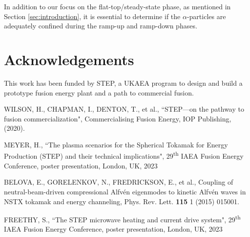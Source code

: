 \documentclass[10pt, a4paper, twoside]{article}
\begin{document}
In addition to our focus on the flat-top/steady-state phase, as mentioned in Section \ref{sec:introduction}, it is essential to determine if the $\alpha$-particles are adequately confined during the ramp-up and ramp-down phases.

\section*{Acknowledgements}

This work has been funded by STEP, a UKAEA program to design and build a prototype fusion energy plant and a path to commercial fusion.

\fontsize{9}{12}\selectfont
\setlength{\parskip}{0pt}
\begin{thebibliography}{9}

    WILSON, H., CHAPMAN, I., DENTON, T., et al., 
    ``STEP---on the pathway to fusion commercialization", 
    Commercialising Fusion Energy, 
    IOP Publishing, 
    (2020).

    MEYER, H.,
    ``The plasma scenarios for the Spherical Tokamak for Energy Production (STEP) and their technical implications",
    29\textsuperscript{th} IAEA Fusion Energy Conference,
    poster presentation, 
    London, UK, 
    2023

    BELOVA, E., GORELENKOV, N., FREDRICKSON, E., et al., 
    Coupling of neutral-beam-driven compressional Alfv\'en eigenmodes to kinetic Alfv\'en waves in NSTX tokamak and energy channeling, 
    Phys. Rev. Lett. 
    \textbf{115} 1 
    (2015) 
    015001.

    FREETHY, S.,
    ``The STEP microwave heating and current drive system",
    29\textsuperscript{th} IAEA Fusion Energy Conference,
    poster presentation, 
    London, UK, 
    2023


\end{thebibliography}
\end{document}

